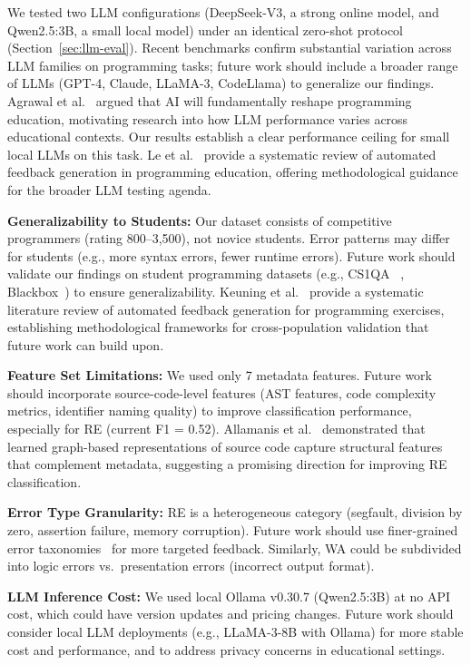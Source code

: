 \documentclass[acmsmall]{acmart}
\begin{document}
We tested two LLM configurations (DeepSeek-V3, a strong online model, and
Qwen2.5:3B, a small local model) under an identical zero-shot protocol
(Section~\ref{sec:llm-eval}). Recent benchmarks\cite{sarsa2024does,pelayo2024exploring}
confirm substantial variation across LLM families on programming tasks; future work
should include a broader range of LLMs (GPT-4, Claude, LLaMA-3, CodeLlama) to
generalize our findings. Agrawal et al.~\cite{agrawal2019will} argued that AI will
fundamentally reshape programming education, motivating research into how LLM
performance varies across educational contexts. Our results establish a clear
performance ceiling for
small local LLMs on this task. Le et al.~\cite{le2023automated} provide a systematic
review of automated feedback generation in programming education, offering
methodological guidance for the broader LLM testing agenda.

\textbf{Generalizability to Students:} Our dataset consists of competitive
programmers (rating 800--3,500), not novice students. Error patterns may
differ for students (e.g., more syntax errors, fewer runtime errors). Future
work should validate our findings on student programming datasets (e.g., CS1QA
~\cite{lee2022cs1qa}, Blackbox~\cite{brown2014blackbox}) to ensure
generalizability. Keuning et al.~\cite{keuning2017systematic} provide a systematic
literature review of automated feedback generation for programming exercises,
establishing methodological frameworks for cross-population validation that
future work can build upon.

\textbf{Feature Set Limitations:} We used only 7 metadata features. Future
work should incorporate source-code-level features (AST features, code
complexity metrics, identifier naming quality) to improve classification
performance, especially for RE (current F1 = 0.52). Allamanis et al.~\cite{allamanis2018learning} demonstrated that learned
graph-based representations of source code capture structural features that
complement metadata, suggesting a promising direction for improving RE
classification.

\textbf{Error Type Granularity:} RE is a heterogeneous category (segfault,
division by zero, assertion failure, memory corruption). Future work should
use finer-grained error taxonomies~\cite{altadmri2015most} for more targeted
feedback. Similarly, WA could be subdivided into logic errors vs.\ presentation
errors (incorrect output format).

\textbf{LLM Inference Cost:} We used local Ollama v0.30.7 (Qwen2.5:3B) at no API cost, which
could have version updates and pricing changes. Future work should consider
local LLM deployments (e.g., LLaMA-3-8B with Ollama) for more stable cost and
performance, and to address privacy concerns in educational settings.
\end{document}
